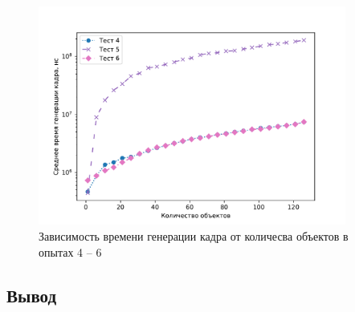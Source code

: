 \begin{figure}[H]
	\centering
    \includegraphics[width=0.9\textwidth]{img/456/plot_time.pdf}
	\caption{Зависимость времени генерации кадра от количесва объектов в опытах 4 -- 6}
	\label{fig:456:time}
\end{figure}



\subsection*{Вывод}

